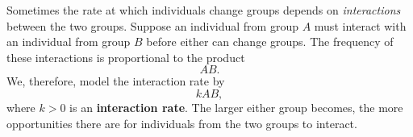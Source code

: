 \documentclass[10pt,letterpaper]{article}
\begin{document}
Sometimes the rate at which individuals change groups depends on
\textit{interactions} between the two groups. Suppose an individual from group $A$ must interact with an individual from group $B$ before either can change groups. The frequency of these interactions is proportional to the product
\[
AB.
\]
We, therefore, model the interaction rate by
\[
kAB,
\]
where $k>0$ is an \textbf{interaction rate}. The larger either group becomes, the more opportunities there are for
individuals from the two groups to interact.


\end{document}
